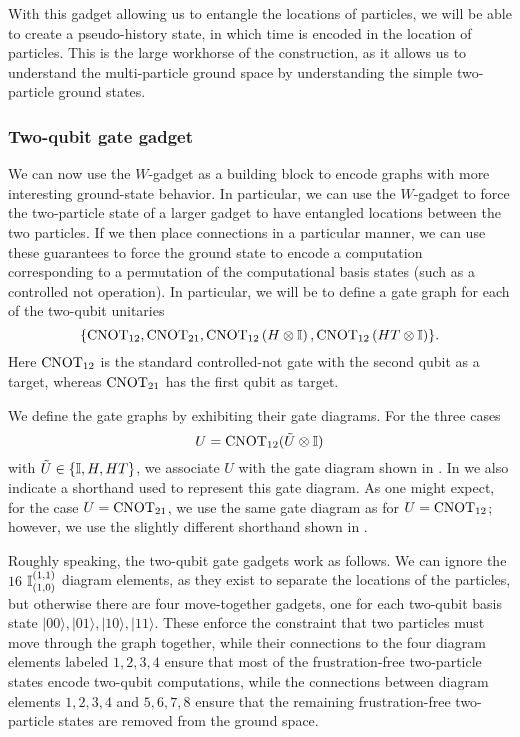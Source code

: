 \documentclass[../thesis-main/thesis-main]{subfiles}
\begin{document}
With this gadget allowing us to entangle the locations of particles, we will be able to create a pseudo-history state, in which time is encoded in the location of particles.  This is the large workhorse of the construction, as it allows us to understand the multi-particle ground space by understanding the simple two-particle ground states.



\subsubsection{Two-qubit gate gadget}

We can now use the $W$-gadget as a building block to encode graphs with more interesting ground-state behavior.  In particular, we can use the $W$-gadget to force the two-particle state of a larger gadget to have entangled locations between the two particles.  If we then place connections in a particular manner, we can use these guarantees to force the ground state to encode a computation corresponding to a permutation of the computational basis states (such as a controlled not operation).  In particular, we will be to define a gate graph for each of the two-qubit unitaries
\begin{equation}
  \{\mathrm{CNOT}_{12}, \mathrm{CNOT}_{21}, \mathrm{CNOT}_{12}\left(H\otimes\mathbb{I}\right),
    \mathrm{CNOT}_{12}\left(HT\otimes\mathbb{I}\right)\}.
\end{equation}
Here $\mathrm{CNOT}_{12}$ is the standard controlled-not gate with the second qubit as a target, whereas $\mathrm{CNOT}_{21}$ has the first qubit as target.

We define the gate graphs by exhibiting their gate diagrams. For the three cases
\begin{equation}
  U=\mathrm{CNOT}_{12}(\tilde U\otimes\mathbb{I})
\end{equation}
with $\tilde U\in\{\mathbb{I},H,HT\}$, we associate $U$ with the gate diagram shown in . In  we also indicate a shorthand used to represent this gate diagram. As one might expect, for the case $U=\mathrm{CNOT}_{21}$, we use the same gate diagram as for $U=\mathrm{CNOT}_{12}$; however, we use the slightly different shorthand shown in .

Roughly speaking, the two-qubit gate gadgets work as follows.  We can ignore the $16$ $\mathbb{I}_{(1,0)}^{(1,1)}$ diagram elements, as they exist to separate the locations of the particles, but otherwise there are four move-together gadgets, one for each two-qubit basis state $|00\rangle, |01\rangle, |10\rangle, |11\rangle$. These enforce the constraint that two particles must move through the graph together, while their connections to the four diagram elements labeled $1,2,3,4$ ensure that most of the frustration-free two-particle states encode two-qubit computations, while the connections between diagram elements $1,2,3,4$ and $5,6,7,8$ ensure that the remaining frustration-free two-particle states are removed from the ground space.
\end{document}
